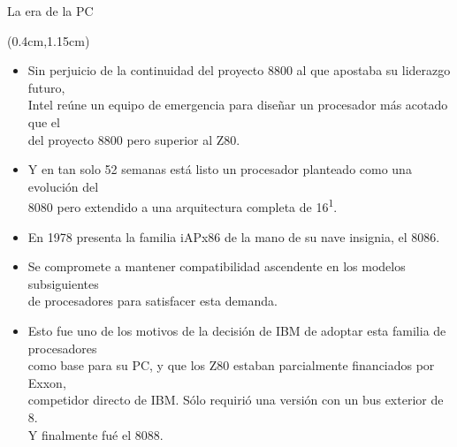 \documentclass[table,dvipsnames,aspectratio=169]{beamer}
\begin{document}
\begin{frame}{La era de la PC}
 \begin{textblock*}{\textwidth}(0.4cm,1.15cm)
  \begin{itemize} [<+(1)->] \justifying
   \item Sin perjuicio de la continuidad del proyecto 8800 al que apostaba su liderazgo futuro,\\
   \textcolor{furfiBlue}{Intel reúne un equipo de emergencia para diseñar un procesador más acotado que el\\
   del proyecto 8800 pero superior al Z80.}
   \item Y en tan solo 52 semanas está listo un procesador planteado como una evolución del\\
   8080 pero extendido a una arquitectura completa de \SI{16}{\bit}\textsuperscript{1}.
   \item \textcolor{furfiBlue}{En 1978 presenta la familia iAPx86 de la mano de su nave insignia, el 8086.}
   \item Se compromete a mantener \textcolor{furfiGreen}{compatibilidad} ascendente en los modelos subsiguientes\\
   de procesadores para satisfacer esta  demanda.
   \item {\small \textcolor{furfiGray}{Esto fue uno de los motivos de la decisión de IBM de adoptar esta familia de procesadores\\
   como base para su PC, y que los Z80 estaban parcialmente financiados por Exxon,\\
   competidor directo de IBM.}} Sólo requirió una versión con un bus exterior de \SI{8}{\bit}.\\
   Y finalmente fué el 8088.
  \end{itemize}
 \end{textblock*}
\end{frame}
\end{document}
